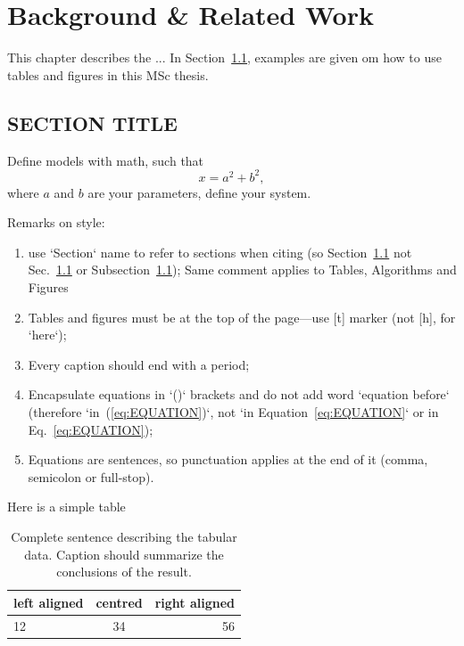 \chapter{Background \& Related Work}
\label{chp:background}

This chapter describes the ... In Section~\ref{sec:SECTIONTITLE}, examples are given om how to use tables and figures in this MSc thesis.

\section{SECTION TITLE}
\label{sec:SECTIONTITLE}


Define models with math, such that
%
\begin{equation}
x = a^2 + b^2,
\label{eq:EQUATION}
\end{equation}
%
where $a$ and $b$ are your parameters, define your system.

Remarks on style:

\begin{enumerate}
	\item use `Section` name to refer to sections when citing (so Section~\ref{sec:SECTIONTITLE} not Sec.~\ref{sec:SECTIONTITLE} or Subsection~\ref{sec:SECTIONTITLE}); Same comment applies to Tables, Algorithms and Figures
	\item Tables and figures must be at the top of the page---use [t] marker (not [h], for `here`); 
	\item Every caption should end with a period;
	\item Encapsulate equations in `()` brackets and do not add word `equation before` (therefore `in~(\ref{eq:EQUATION})`, not `in Equation~\ref{eq:EQUATION}` or in Eq.~\ref{eq:EQUATION});
	\item Equations are sentences, so punctuation applies at the end of it (comma, semicolon or full-stop).
\end{enumerate}

Here is a simple table

\begin{table}[t]
\centering
\begin{tabular}{| l | c | r |}
\hline
left aligned & centred & right aligned \\
\hline \hline
12 & 34 & 56 \\
\hline
\end{tabular}
\caption{Complete sentence describing the tabular data. Caption should summarize the conclusions of the result.}
\label{tab:table_1}
\end{table}

